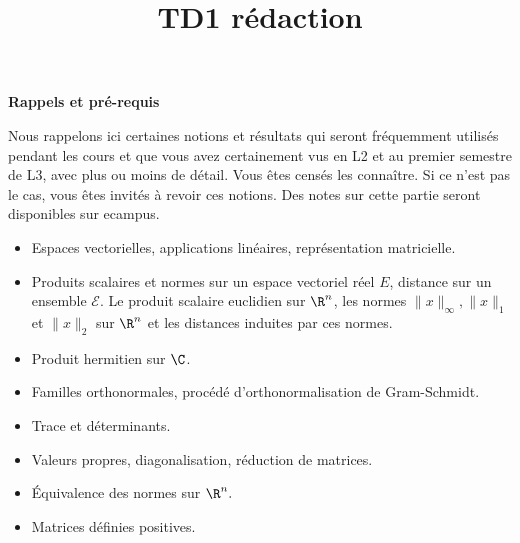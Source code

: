 
\newcommand{\tn}{\mathrm}
\newcommand{\eref}[1]{(\ref{#1})}
\newcommand{\dep}[2]{\partial_{#2}{#1}}
\newcommand{\dis}{\displaystyle}
\newcommand{\M}{\mathcal{M}}
\newcommand{\MmnK}{\mathcal{M}_{m,n}(\K)}
\newcommand{\MnpK}{\mathcal{M}_{n,p}(\K)}
\newcommand{\MnK}{\mathcal{M}_{n}(\K)}
\newcommand{\MmK}{\mathcal{M}_{m}(\K)}
\newcommand{\MmnR}{\mathcal{M}_{m,n}(\R)}
\newcommand{\MnR}{\mathcal{M}_{n}(\R)}
\newcommand{\MnC}{\mathcal{M}_{n}(\C)}
\newcommand{\MmR}{\mathcal{M}_{m}(\R)}
\newcommand{\MpnR}{\mathcal{M}_{p,n}(\R)}
\newcommand{\MnpR}{\mathcal{M}_{n,p}(\R)}
\newcommand{\MpnC}{\mathcal{M}_{p,n}(\C)}
\newcommand{\MnpC}{\mathcal{M}_{n,p}(\C)}
\newcommand{\nmt}[1]{|\mskip -2mu|\mskip -2mu|{#1}|\mskip -2mu |\mskip -2mu|}
\title{TD1 rédaction}


\maketitle
\begin{center}
{\large {\bf Rappels et pré-requis}}
\end{center}

Nous rappelons ici certaines notions et résultats qui seront fréquemment utilisés pendant les cours et que vous avez certainement vus en L2 et au premier semestre de L3, avec plus ou moins de détail. Vous êtes censés les connaître. Si ce n'est pas le cas, vous êtes invités  à revoir ces notions. Des notes sur cette partie seront disponibles sur ecampus. 

\begin{itemize}
\item Espaces vectorielles, applications linéaires, représentation matricielle.
\item Produits scalaires et normes sur un espace vectoriel réel $E$, distance sur un ensemble $\mathcal{E}.$ Le produit scalaire euclidien sur $\R^n$, les normes $\|x\|_{\infty}, \|x\|_{1}$ et $\|x\|_{2}$ sur $\R^n$ et les distances induites par ces normes.
\item Produit hermitien sur $\C$.
\item Familles orthonormales, procédé d'orthonormalisation de Gram-Schmidt.
\item Trace et déterminants.
\item Valeurs propres, diagonalisation, réduction de matrices.
\item Équivalence des normes sur $\R^n.$
\item Matrices définies positives.
\end{itemize}

